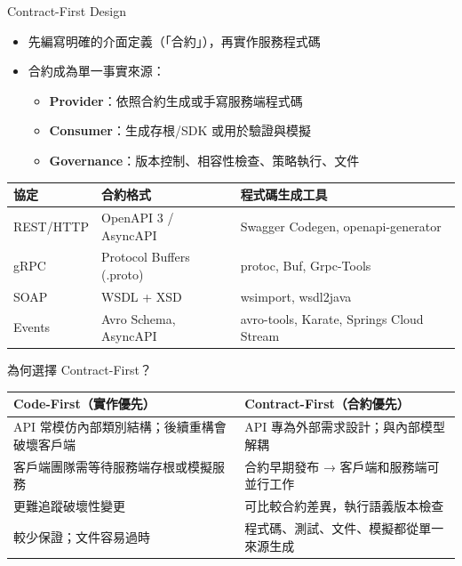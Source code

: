 \documentclass[UTF8]{beamer}
\begin{document}
\begin{frame}{Contract-First Design}
    \begin{itemize}
        \item 先編寫明確的介面定義（「合約」），再實作服務程式碼
        \item 合約成為單一事實來源：
        \begin{itemize}
            \item \textbf{Provider}：依照合約生成或手寫服務端程式碼
            \item \textbf{Consumer}：生成存根/SDK 或用於驗證與模擬
            \item \textbf{Governance}：版本控制、相容性檢查、策略執行、文件
        \end{itemize}
    \end{itemize}
    \tiny
    \begin{center}
        \begin{tabular}{|l|l|l|}
            \hline
            \textbf{協定} & \textbf{合約格式} & \textbf{程式碼生成工具} \\
            \hline
            REST/HTTP & OpenAPI 3 / AsyncAPI & Swagger Codegen, openapi-generator \\
            \hline
            gRPC & Protocol Buffers (.proto) & protoc, Buf, Grpc-Tools \\
            \hline
            SOAP & WSDL + XSD & wsimport, wsdl2java \\
            \hline
            Events & Avro Schema, AsyncAPI & avro-tools, Karate, Springs Cloud Stream \\
            \hline
        \end{tabular}
    \end{center}
\end{frame}

\begin{frame}{為何選擇 Contract-First？}
    \begin{center}
        \begin{tabular}{|p{}|p{}|}
            \hline
            \textbf{Code-First（實作優先）} & \textbf{Contract-First（合約優先）} \\
            \hline
            API 常模仿內部類別結構；後續重構會破壞客戶端 & API 專為外部需求設計；與內部模型解耦 \\
            \hline
            客戶端團隊需等待服務端存根或模擬服務 & 合約早期發布 → 客戶端和服務端可並行工作 \\
            \hline
            更難追蹤破壞性變更 & 可比較合約差異，執行語義版本檢查 \\
            \hline
            較少保證；文件容易過時 & 程式碼、測試、文件、模擬都從單一來源生成 \\
            \hline
        \end{tabular}
    \end{center}
\end{frame}
\end{document}
